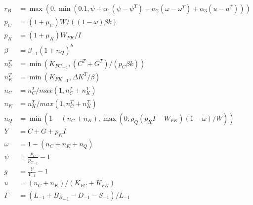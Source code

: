 \documentclass{article}
\begin{document}
\begin{align}
    r_B          & = \max(0,\min(0.1, \psi + \alpha_1 (\psi - \psi^T) - \alpha_2 (\omega - \omega^T) + \alpha_3 (u - u^T))) \\
    p_C          & = (1 + \mu_C) W / ((1-\omega) \beta k)                                                                   \\
    p_K          & = (1+\mu_K) W_{FK} / I                                                                                   \\
    \beta        & = \beta_{-1} (1+n_Q)^b                                                                                   \\
    n_C^T        & = \min({K_{FC}}_{-1}, (C^T + G^T) / (p_C \beta k))                                                       \\
    n_K^T        & = \min({K_{FK}}_{-1}, {\Delta K}^T / \beta)                                                              \\
    n_C          & = n_C^T / max(1, n_C^T + n_K^T)                                                                          \\
    n_K          & = n_K^T / max(1, n_C^T + n_K^T)                                                                          \\
    n_Q          & = \min(1-(n_C+n_K), \max(0, \rho_Q (p_K I - W_{FK}) (1 - \omega) / W))                                   \\
    Y            & = C + G + p_K I                                                                                          \\
    \omega       & = 1 - (n_C + n_K + n_Q)                                                                                  \\
    \psi         & = \frac{p_C}{{p_C}_{-1}} - 1                                                                             \\
    g            & = \frac{Y}{Y_{-1}} - 1                                                                                   \\
    u            & = (n_C + n_K) / (K_{FC} + K_{FK})                                                                        \\
    \Gamma       & = (L_{-1} + {B_B}_{-1} - D_{-1} - S_{-1})/L_{-1}
\end{align}
\end{document}
